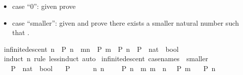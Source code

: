 \begin{isabellebody}
\begin{isamarkuptext}
%
\begin{itemize}%
\item case ``0'': given  prove 

\item case ``smaller'': given  and  prove there exists
a smaller natural number  such that .%
\end{itemize}%
\end{isamarkuptext}\isamarkuptrue%
\isamarkupfalse%
\ infinite{\isacharunderscore}{\kern0pt}descent{\isacharcolon}{\kern0pt}\ {\isachardoublequoteopen}{\isacharparenleft}{\kern0pt}{\isasymAnd}n{\isachardot}{\kern0pt}\ {\isasymnot}\ P\ n\ {\isasymLongrightarrow}\ {\isasymexists}m{\isacharless}{\kern0pt}n{\isachardot}{\kern0pt}\ {\isasymnot}\ P\ m{\isacharparenright}{\kern0pt}\ {\isasymLongrightarrow}\ P\ n{\isachardoublequoteclose}\ \ P\ {\isacharcolon}{\kern0pt}{\isacharcolon}{\kern0pt}\ {\isachardoublequoteopen}nat\ {\isasymRightarrow}\ bool{\isachardoublequoteclose}\isanewline
\ \ %
\isanewline
%
\isadelimproof
\ \ %
\endisadelimproof
%
\isatagproof
{}\isamarkupfalse%
\ {\isacharparenleft}{\kern0pt}induct\ n\ rule{\isacharcolon}{\kern0pt}\ less{\isacharunderscore}{\kern0pt}induct{\isacharparenright}{\kern0pt}\ auto%
\endisatagproof
{\isafoldproof}%
%
\isadelimproof
\isanewline
%
\endisadelimproof
\isanewline
{}\isamarkupfalse%
\ infinite{\isacharunderscore}{\kern0pt}descent{}\ {\isacharbrackleft}{\kern0pt}case{\isacharunderscore}{\kern0pt}names\ {}\ smaller{\isacharbrackright}{\kern0pt}{\isacharcolon}{\kern0pt}\isanewline
\ \ \ P\ {\isacharcolon}{\kern0pt}{\isacharcolon}{\kern0pt}\ {\isachardoublequoteopen}nat\ {\isasymRightarrow}\ bool{\isachardoublequoteclose}\isanewline
\ \ \ {\isachardoublequoteopen}P\ {}{\isachardoublequoteclose}\isanewline
\ \ \ \ \ {\isachardoublequoteopen}{\isasymAnd}n{\isachardot}{\kern0pt}\ n\ {\isachargreater}{\kern0pt}\ {}\ {\isasymLongrightarrow}\ {\isasymnot}\ P\ n\ {\isasymLongrightarrow}\ {\isasymexists}m{\isachardot}{\kern0pt}\ m\ {\isacharless}{\kern0pt}\ n\ {\isasymand}\ {\isasymnot}\ P\ m{\isachardoublequoteclose}\isanewline
\ \ \ {\isachardoublequoteopen}P\ n{\isachardoublequoteclose}\isanewline
%
\isadelimproof
%
\endisadelimproof

\end{isabellebody}
